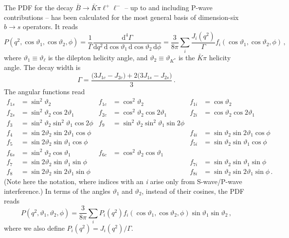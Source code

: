 \documentclass[aps,prd,reprint,nofootinbib,preprintnumbers]{revtex4}
\newcommand{\dd}{\text{d}}
\renewcommand{\theta}{\vartheta}
\begin{document}
The PDF for the decay $\bar{B}\to\bar{K}\pi\ell^+\ell^-$ -- up to and including P-wave contributions -- has been calculated
for the most general basis of dimension-six $b\to s$ operators. It reads \cite{Blake:2012mb,Bobeth:2012vn}
\begin{equation}
    P(q^2, \cos\theta_1, \cos\theta_2, \phi) = \frac{1}{\Gamma} \frac{\dd^4\Gamma}{\dd q^2\,\dd \cos\theta_1\,\dd \cos\theta_2\,\dd \phi} = \frac{3}{8\pi} \sum_i \frac{J_{i}(q^2)}{\Gamma} f_i(\cos\theta_1, \cos\theta_2, \phi)\,,
\end{equation}
where $\theta_1 \equiv \theta_\ell$ is the dilepton helicity angle, and $\theta_2 \equiv \theta_{K^*}$ is the $\bar{K}\pi$ helicity angle.
The decay width is
\begin{equation}
    \Gamma = \frac{\big(3 J_{1c} - J_{2c}\big) + 2\big(3J_{1s} - J_{2s}\big)}{3}\,.
\end{equation}
The angular functions read \cite{Blake:2012mb,Bobeth:2012vn}
\begin{equation}
\begin{aligned}
    f_{1s} & = \sin^2\theta_2 &
    f_{1c} & = \cos^2\theta_2 &
    f_{1i} & = \cos\theta_2\\
    f_{2s} & = \sin^2\theta_2 \cos 2\theta_1 &
    f_{2c} & = \cos^2\theta_2 \cos 2\theta_1 &
    f_{2i} & = \cos\theta_2 \cos 2\theta_1\\
    f_{3}  & = \sin^2\theta_2\sin^2\theta_1 \cos 2\phi &
    f_{9}  & = \sin^2\theta_2\sin^2\theta_1 \sin 2\phi\\
    f_{4}  & = \sin 2\theta_2 \sin 2\theta_1 \cos\phi & & &
    f_{4i} & = \sin\theta_2 \sin 2\theta_1 \cos\phi\\
    f_{5}  & = \sin 2\theta_2 \sin \theta_1 \cos\phi & & &
    f_{5i} & = \sin\theta_2 \sin \theta_1 \cos\phi\\
    f_{6s} & = \sin^2\theta_2 \cos\theta_1 &
    f_{6c} & = \cos^2\theta_2 \cos\theta_1\\
    f_{7}  & = \sin 2\theta_2 \sin \theta_1 \sin\phi & & &
    f_{7i} & = \sin\theta_2 \sin \theta_1 \sin\phi\\
    f_{8}  & = \sin 2\theta_2 \sin 2\theta_1 \sin\phi & & &
    f_{8i} & = \sin\theta_2 \sin 2\theta_1 \sin\phi\,.
\end{aligned}
\end{equation}
(Note here the notation, where indices with an \emph{i} arise only from S-wave/P-wave interference.)
In terms of the angles $\theta_1$ and $\theta_2$, instead of their cosines, the PDF reads
\begin{equation}
    P(q^2, \theta_1, \theta_2, \phi) = \frac{3}{8\pi} \sum_i P_i(q^2) f_i(\cos\theta_1, \cos\theta_2, \phi) \sin\theta_1 \sin\theta_2\,,
\end{equation}
where we also define $P_i(q^2) = J_i(q^2) / \Gamma$.\\
\end{document}
